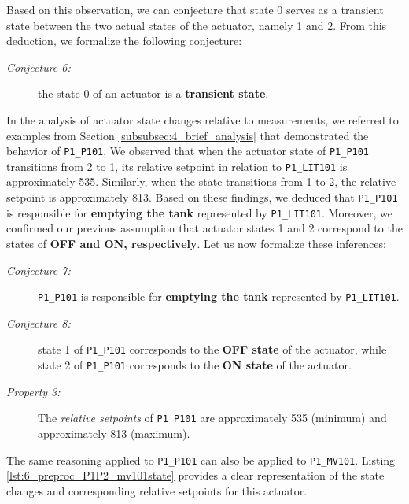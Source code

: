 Based on this observation, we can conjecture that state 0 serves as a transient state between the two actual states of the actuator, namely 1 and 2. From this deduction, we formalize the following conjecture:

\begin{description}
	\item[\colorbox{backcolourtext}{\normalfont\textit{Conjecture 6:}}] the state 0 of an actuator is a \textbf{transient state}.
\end{description}

In the analysis of actuator state changes relative to measurements, we referred to examples from Section \ref{subsubsec:4_brief_analysis} that demonstrated the behavior of \texttt{P1\_P101}. We observed that when the actuator state of \texttt{P1\_P101} transitions from 2 to 1, its relative setpoint in relation to \texttt{P1\_LIT101} is approximately 535. Similarly, when the state transitions from 1 to 2, the relative setpoint is approximately 813. Based on these findings, we deduced that \texttt{P1\_P101} is responsible for \textbf{emptying the tank} represented by \texttt{P1\_LIT101}. Moreover, we confirmed our previous assumption that actuator states 1 and 2 correspond to the states of \textbf{OFF and ON, respectively}. Let us now formalize these inferences:

\begin{description}
	\item[\colorbox{backcolourtext}{\normalfont\textit{Conjecture 7:}}] \texttt{P1\_P101} is responsible for \textbf{emptying the tank} represented by \texttt{P1\_LIT101}.
	
	\item[\colorbox{backcolourtext}{\normalfont\textit{Conjecture 8:}}] state 1 of \texttt{P1\_P101} corresponds to the \textbf{OFF state} of the actuator, while state 2 of \texttt{P1\_P101} corresponds to the \textbf{ON state} of the actuator.
	
	\item[\colorbox{backcolourtext}{\normalfont\textit{Property 3:}}] The \textit{relative setpoints} of \texttt{P1\_P101} are approximately 535 (minimum) and approximately 813 (maximum).
\end{description}

The same reasoning applied to \texttt{P1\_P101} can also be applied to \texttt{P1\_MV101}. Listing \ref{lst:6_preproc_P1P2_mv101state} provides a clear representation of the state changes and corresponding relative setpoints for this actuator. 


